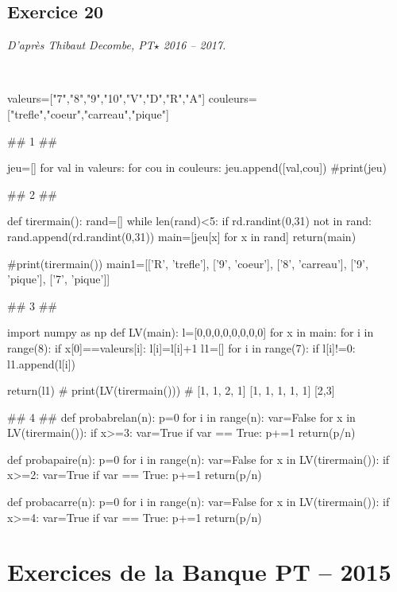 \documentclass[10pt,fleqn]{article} %
\begin{document}
\subsection*{Exercice 20}
\textit{D'après Thibaut Decombe, PT$\star$ 2016 -- 2017.}
\begin{corrige}
$\quad$
\begin{python}
valeurs=["7","8","9","10","V","D","R","A"]
couleurs=["trefle","coeur","carreau","pique"]

## 1 ##

jeu=[]
for val in valeurs:
    for cou in couleurs:
        jeu.append([val,cou])
#print(jeu)
        
## 2 ##
        
def tirermain():
    rand=[]
    while len(rand)<5:
        if rd.randint(0,31) not in rand:
            rand.append(rd.randint(0,31))
    main=[jeu[x] for x in rand]
    return(main)

#print(tirermain())
main1=[['R', 'trefle'], ['9', 'coeur'], ['8', 'carreau'], ['9', 'pique'], ['7', 'pique']]

    
## 3 ##

import numpy as np
def LV(main):
    l=[0,0,0,0,0,0,0,0]
    for x in main:
        for i in range(8):
            if x[0]==valeurs[i]:
                l[i]=l[i]+1
    l1=[]
    for i in range(7):
        if l[i]!=0:
            l1.append(l[i])
    
    return(l1)
# print(LV(tirermain()))
# [1, 1, 2, 1]       [1, 1, 1, 1, 1]     [2,3]

## 4 ##
def probabrelan(n):
    p=0
    for i in range(n):
        var=False
        for x in LV(tirermain()):
            if x>=3:
                var=True
        if var == True:
            p+=1
    return(p/n)
    

def probapaire(n):
    p=0
    for i in range(n):
        var=False
        for x in LV(tirermain()):
            if x>=2:
                var=True
        if var == True:
            p+=1
    return(p/n)
    
def probacarre(n):
    p=0
    for i in range(n):
        var=False
        for x in LV(tirermain()):
            if x>=4:
                var=True
        if var == True:
            p+=1
    return(p/n)
\end{python}
\end{corrige}


\newpage 
\section{Exercices de la Banque PT -- 2015}
\end{document}
